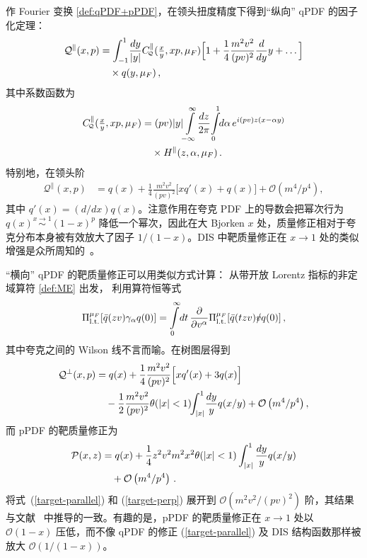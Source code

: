 作 Fourier 变换 \eqref{def:qPDF+pPDF}，在领头扭度精度下得到``纵向'' qPDF 的因子化定理：
\begin{align}
\label{qPDF2}
 \mathcal{Q}^\parallel(x,p) &= \int_{-1}^1 \!\frac{dy}{|y|} C^\parallel_{\Qd}(\tfrac{x}{y},xp,\mu_F)
\Big[1 + \frac{1}{4} \frac{m^2 v^2}{(pv)^2} \frac{d}{dy} y +\ldots \Big]
\notag\\&\quad
\times  q(y,\mu_F)\,,
\end{align}
其中系数函数为
\begin{align}
  C^\parallel_{\Qd}(\tfrac{x}{y},xp,\mu_F) &= (pv)|y|\!\int\limits_{-\infty}^{\infty}\!\frac{dz}{2\pi}\! \int\limits_0^1\!\! d\alpha\,
e^{i(pv)z(x-\alpha y)}
\notag\\&\quad \times H^\parallel(z,\alpha,\mu_F)\,.
\end{align}
特别地，在领头阶
\begin{align}
\label{target-parallel}
 \mathcal{Q}^\parallel(x,p) &= q(x) + \frac{1}{4} \frac{m^2 v^2}{(pv)^2} \big[x q'(x)  + q(x)\big]
+ \mathcal{O}\left({m^4}/{p^4}\right),
\end{align}
其中 $q'(x) = (d/dx) q(x)$。注意作用在夸克 PDF 上的导数会把幂次行为 $q(x) \stackrel{x \to 1}{\sim} (1-x)^p$ 降低一个幂次，因此在大 Bjorken $x$ 处，质量修正相对于夸克分布本身被有效放大了因子 $1/(1-x)$。DIS 中靶质量修正在 $x\to 1$ 处的类似增强是众所周知的~\cite{Nachtmann:1973mr}。

``横向'' qPDF 的靶质量修正可以用类似方式计算：
从带开放 Lorentz 指标的非定域算符 \eqref{def:ME} 出发，
利用算符恒等式~\cite{Balitsky:1987bk}
\begin{align}
\Pi_{\rm l.t.}^{\mu_F}[\bar q (z v) \gamma_\alpha q(0)]
=  \int\limits_0^\infty \!dt\,\frac{\partial}{\partial v^\alpha}
\Pi_{\rm l.t.}^{\mu_F}[\bar q ( t z v) \slashed{v} q(0)]\,,
\end{align}
其中夸克之间的 Wilson 线不言而喻。在树图层得到
\begin{align}
\label{target-perp}
 \mathcal{Q}^\perp(x,p)  &=  q(x) + \frac{1}{4} \frac{ m^2 v^2 }{(pv)^2} \Big[ x q'(x) + 3 q(x) \Big]
\notag\\&\quad
-  \frac{1}{2} \frac{m^2 v^2}{(pv)^2} \theta(|x|<1)\!\! \int_{|x|}^1\! \frac{dy}{y} q(x/y)
+ \mathcal{O}\left({m^4}/{p^4}\right),
\end{align}
而 pPDF 的靶质量修正为
\begin{align}
\label{target-pPDF}
 \mathcal{P}(x,z) &=  q(x) +  \frac14 z^2 v^2 m^2 x^2 \theta(|x|<1) \int_{|x|}^1 \frac{dy}{y} q(x/y)
\notag\\&\quad
+ \mathcal{O}\left({m^4}/{p^4}\right)\,.
\end{align}
将式~(\ref{target-parallel}) 和 (\ref{target-perp}) 展开到 $\mathcal O(m^2v^2/(pv)^2)$ 阶，其结果与文献~\cite{Chen:2016utp} 中推导的一致。有趣的是，pPDF 的靶质量修正在 $x\to 1$ 处以 $\mathcal{O}(1-x)$ 压低，而不像 qPDF 的修正 (\ref{target-parallel}) 及 DIS 结构函数那样被放大 $\mathcal{O}(1/(1-x))$。

